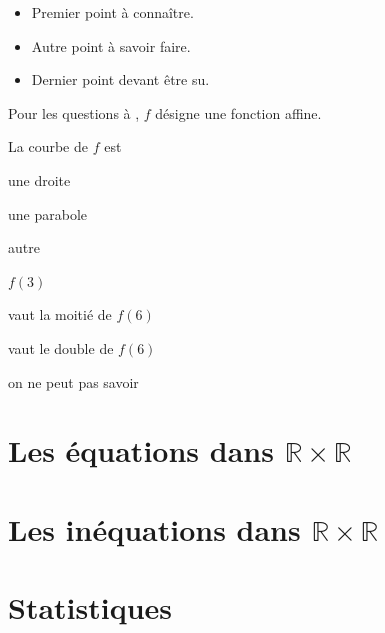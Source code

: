 \documentclass[nocrop]{sesamanuel}
\begin{document}
\exercicesappr


\connaissances
\begin{acquis}
\begin{itemize}
\item  Premier  point  à  connaître.
\item  Autre  point  à  savoir  faire.
\item  Dernier  point  devant  être  su.
\end{itemize}
\end{acquis}
\begin{QCM}
\begin{EnonceCommunQCM}
Pour  les  questions    à
,  $f$  désigne  une fonction  affine.
\end{EnonceCommunQCM}
\begin{GroupeQCM}
\begin{exercice}\label{premier-qcm} La  courbe  de  $f$  est
\begin{ChoixQCM}{3}
\item  une  droite
\item  une  parabole
\item  autre
\end{ChoixQCM}
\end{exercice}
\begin{corrige}
\end{corrige}
\begin{exercice}\label{deuxieme-qcm}
$f(3)$
\begin{ChoixQCM}{3}
\item  vaut  la  moitié  de  $f(6)$
\item  vaut  le  double  de  $f(6)$
\item  on  ne  peut  pas savoir
\end{ChoixQCM}
\end{exercice}
\begin{corrige}
\end{corrige}
\end{GroupeQCM}
\end{QCM}

\chapter{Les équations dans $\mathbb{R} \times \mathbb{R}$}

\chapter{Les inéquations dans $\mathbb{R} \times \mathbb{R}$}

\chapter{Statistiques}
\end{document}
